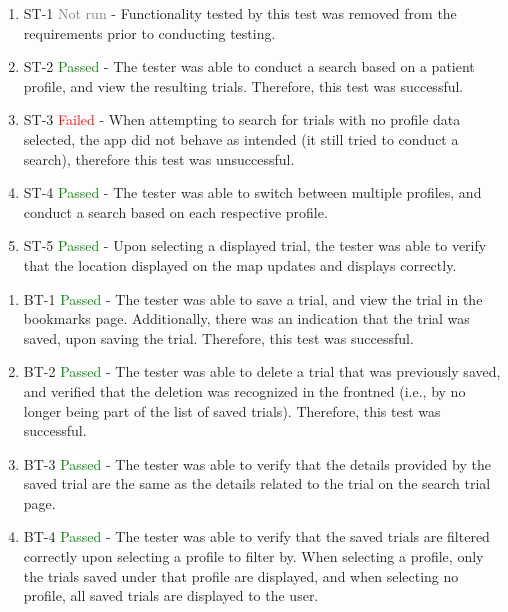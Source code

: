 \documentclass[12pt, titlepage]{article}
\begin{document}
\begin{enumerate}
  \item ST-1 \textcolor{gray}{Not run} - Functionality tested by this test was removed from the requirements prior to conducting testing.
  \item ST-2 \textcolor{green}{Passed} - The tester was able to conduct a search based on a patient profile, and view the resulting trials. Therefore, this test was 
  successful.
  \item ST-3 \textcolor{red}{Failed} - When attempting to search for trials with no profile data selected, the app did not behave as intended (it
  still tried to conduct a search), therefore this test was unsuccessful.
  \item ST-4 \textcolor{green}{Passed} - The tester was able to switch between multiple profiles, and conduct a search based on each respective profile.
  \item ST-5 \textcolor{green}{Passed} - Upon selecting a displayed trial, the tester was able to verify that the location displayed on the map updates and displays correctly.\\

\end{enumerate}


\normalsize

\begin{enumerate}
  \item BT-1 \textcolor{green}{Passed} - The tester was able to save a trial, and view the trial in the bookmarks page. Additionally, there was an indication that
  the trial was saved, upon saving the trial. Therefore, this test was successful.
  \item BT-2 \textcolor{green}{Passed} - The tester was able to delete a trial that was previously saved, and verified that the deletion was recognized in the frontned (i.e., by 
  no longer being part of the list of saved trials). Therefore, this test was successful.
  \item BT-3 \textcolor{green}{Passed} - The tester was able to verify that the details provided by the saved trial are the same as the details related to the trial 
  on the search trial page.
  \item BT-4 \textcolor{green}{Passed} - The tester was able to verify that the saved trials are filtered correctly upon selecting a profile to filter by. When selecting a 
  profile, only the trials saved under that profile are displayed, and when selecting no profile, all saved trials are displayed to the user.

\end{enumerate}
\end{document}
